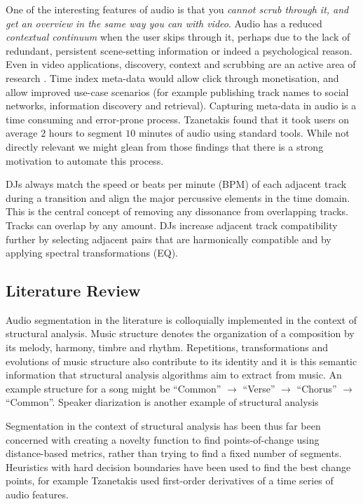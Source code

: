\documentclass[twocolumn]{article}
\begin{document}
	One of the interesting features of audio is that you \textit{cannot scrub through it, and get an overview in the same way you can with video}. Audio has a reduced \textit{contextual continuum} when the user skips through it, perhaps due to the lack of redundant, persistent scene-setting information or indeed a psychological reason. Even in video applications, discovery, context and scrubbing are an active area of research \cite{Matejka:2013:SIO:2470654.2466149}. Time index meta-data would allow click through monetisation, and allow improved use-case scenarios (for example publishing track names to social networks, information discovery and retrieval). Capturing meta-data in audio is a time consuming and error-prone process. Tzanetakis \cite{tzanetakis1999framework} found that it took users on average $2$ hours to segment $10$ minutes of audio using standard tools. While not directly relevant we might glean from those findings that there is a strong motivation to automate this process.
	
	DJs always match the speed or beats per minute (BPM) of each adjacent track during a transition and align the major percussive elements in the time domain. This is the central concept of removing any dissonance from overlapping tracks. Tracks can overlap by any amount. DJs increase adjacent track compatibility further by selecting adjacent pairs that are harmonically compatible and by applying spectral transformations (EQ).
	
	\subsection{Literature Review}
	
	Audio segmentation in the literature is colloquially implemented in the context of structural analysis. Music structure denotes the organization of a composition by its melody, harmony, timbre and rhythm. Repetitions, transformations and evolutions of music structure also contribute to its identity and it is this semantic information that structural analysis algorithms aim to extract from music. An example structure for a song might be ``Common'' $\rightarrow$ ``Verse'' $\rightarrow$ ``Chorus'' $\rightarrow$ ``Common''. Speaker diarization is another example of structural analysis 
	
	Segmentation in the context of structural analysis has been thus far been concerned with creating a novelty function to find points-of-change using distance-based metrics, rather than trying to find a fixed number of segments. Heuristics with hard decision boundaries have been used to find the best change points, for example Tzanetakis \cite{tzanetakis1999framework} used first-order derivatives of a time series of audio features. 
	
\end{document}
